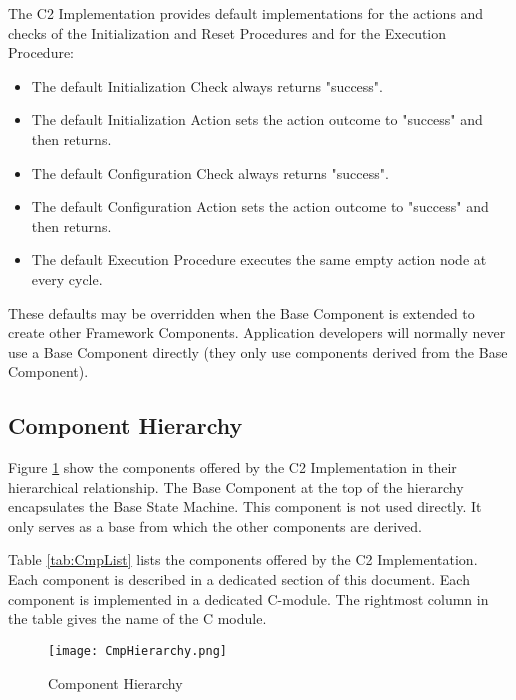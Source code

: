 \documentclass{pnp_article}
\begin{document}
The C2 Implementation provides default implementations for the actions and checks of the Initialization and Reset Procedures and for the Execution Procedure:

\begin{itemize}
\item The default Initialization Check always returns "success".
\item The default Initialization Action sets the action outcome to "success" and then returns.
\item The default Configuration Check always returns "success".
\item The default Configuration Action sets the action outcome to "success" and then returns.
\item The default Execution Procedure executes the same empty action node at every cycle.
\end{itemize}

These defaults may be overridden when the Base Component is extended to create other Framework Components. Application developers will normally never use a Base Component directly (they only use components derived from the Base Component). 

\subsection{Component Hierarchy}\label{sec:CmpHierarchy} 
Figure \ref{fig:CmpHierarchy} show the components offered by the C2 Implementation in their hierarchical relationship. The Base Component at the top of the hierarchy encapsulates the Base State Machine. This component is not used directly. It only serves as a base from which the other components are derived.

Table \ref{tab:CmpList} lists the components offered by the C2 Implementation. Each component is described in a dedicated section of this document. Each component is implemented in a dedicated C-module. The rightmost column in the table gives the name of the C module.

\begin{figure}[H]
 \centering
 \texttt{[image: CmpHierarchy.png]}
 \caption{Component Hierarchy}
 \label{fig:CmpHierarchy}
\end{figure}
\end{document}
